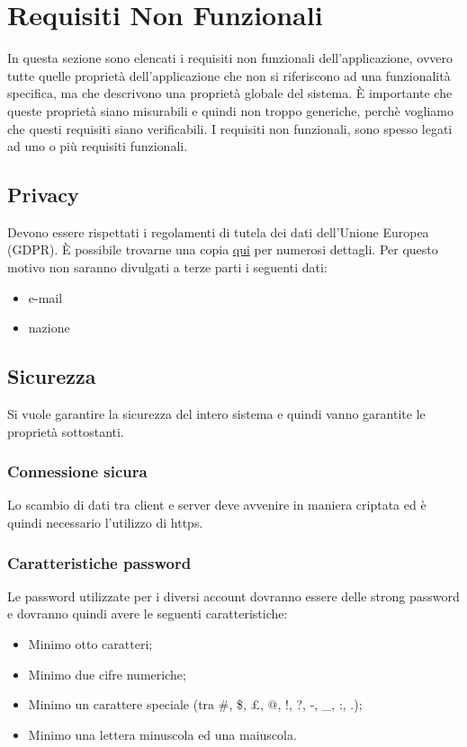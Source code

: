 \section{Requisiti Non Funzionali}
In questa sezione sono elencati i requisiti non funzionali dell'applicazione, ovvero tutte quelle proprietà dell'applicazione che non si riferiscono ad una funzionalità specifica, ma che descrivono una proprietà globale del sistema. È importante che queste proprietà siano misurabili e quindi non troppo generiche, perchè vogliamo che questi requisiti siano verificabili. I requisiti non funzionali, sono spesso legati ad uno o più requisiti funzionali.

\subsection{Privacy}
Devono essere rispettati i regolamenti di tutela dei dati dell'Unione Europea (GDPR). È possibile trovarne una copia \href{https://eur-lex.europa.eu/legal-content/EN/TXT/PDF/?uri=CELEX:32016R0679}{qui} per numerosi dettagli. Per questo motivo non saranno divulgati a terze parti i seguenti dati:
\begin{itemize}
    \item e-mail
    \item nazione
\end{itemize}

\subsection{Sicurezza}
Si vuole garantire la sicurezza del intero sistema e quindi vanno garantite le proprietà sottostanti.

\subsubsection{Connessione sicura}
Lo scambio di dati tra client e server deve avvenire in maniera criptata ed è quindi necessario l'utilizzo di https.

\subsubsection{Caratteristiche password}
Le password utilizzate per i diversi account dovranno essere delle strong password e dovranno quindi avere le seguenti caratteristiche: 
\begin{itemize}
    \item Minimo otto caratteri;
    \item Minimo due cifre numeriche;
    \item Minimo un carattere speciale (tra \#, \$, £, @, !, ?, -, \_, :, .);
    \item Minimo una lettera minuscola ed una maiuscola.
\end{itemize} 

